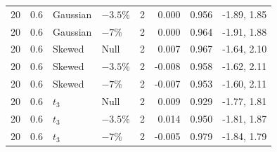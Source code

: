 \begin{table}[H]
\begin{tabular*}{\textwidth}{@{\extracolsep{\fill}}rrllrrrr}
20 & 0.6 & Gaussian & $-3.5\%$ & 2 & 0.000 & 0.956 & -1.89, 1.85 \\
20 & 0.6 & Gaussian & $-7\%$ & 2 & 0.000 & 0.964 & -1.91, 1.88 \\
20 & 0.6 & Skewed & Null & 2 & 0.007 & 0.967 & -1.64, 2.10 \\
20 & 0.6 & Skewed & $-3.5\%$ & 2 & -0.008 & 0.958 & -1.62, 2.11 \\
20 & 0.6 & Skewed & $-7\%$ & 2 & -0.007 & 0.953 & -1.60, 2.11 \\
20 & 0.6 & $t_3$ & Null & 2 & 0.009 & 0.929 & -1.77, 1.81 \\
20 & 0.6 & $t_3$ & $-3.5\%$ & 2 & 0.014 & 0.950 & -1.81, 1.87 \\
20 & 0.6 & $t_3$ & $-7\%$ & 2 & -0.005 & 0.979 & -1.84, 1.79 \\
\bottomrule
\end{tabular*}
\end{table}

